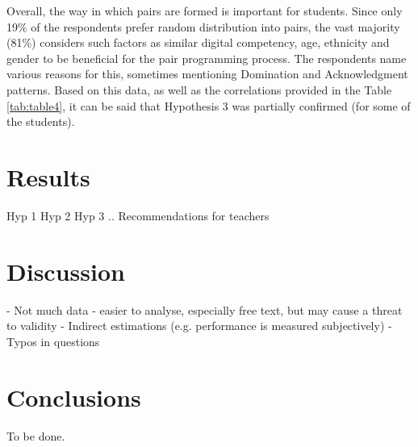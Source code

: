 \documentclass[conference]{IEEEtran}
\begin{document}
Overall, the way in which pairs are formed is important for students. Since only 19\% of the respondents prefer random distribution into pairs, the vast majority (81\%) considers such factors as similar digital competency, age, ethnicity and gender to be beneficial for the pair programming process. The respondents name various reasons for this, sometimes mentioning Domination and Acknowledgment patterns. Based on this data, as well as the correlations provided in the Table \ref{tab:table4}, it can be said that Hypothesis 3 was partially confirmed (for some of the students).

\section{Results}
Hyp 1
Hyp 2
Hyp 3
..
Recommendations for teachers

\section{Discussion}
- Not much data - easier to analyse, especially free text, but may cause a threat to validity
- Indirect estimations (e.g. performance is measured subjectively)
- Typos in questions

\section{Conclusions}
To be done.
\end{document}
